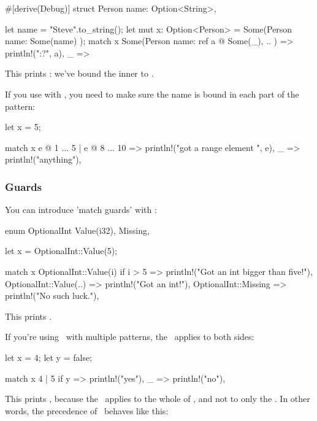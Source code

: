 \begin{rustc}
#[derive(Debug)]
struct Person {
    name: Option<String>,
}

let name = "Steve".to_string();
let mut x: Option<Person> = Some(Person { name: Some(name) });
match x {
    Some(Person { name: ref a @ Some(_), .. }) => println!("{:?}", a),
    _ => {}
}
\end{rustc}

This prints : we've bound the inner  to .

\blank

If you use  with \code{|}, you need to make sure the name is bound in each part of the pattern:

\begin{rustc}
let x = 5;

match x {
    e @ 1 ... 5 | e @ 8 ... 10 => println!("got a range element {}", e),
    _ => println!("anything"),
}
\end{rustc}

\subsubsection*{Guards}

You can introduce 'match guards' with \keyif:

\begin{rustc}
enum OptionalInt {
    Value(i32),
    Missing,
}

let x = OptionalInt::Value(5);

match x {
    OptionalInt::Value(i) if i > 5 => println!("Got an int bigger than five!"),
    OptionalInt::Value(..) => println!("Got an int!"),
    OptionalInt::Missing => println!("No such luck."),
}
\end{rustc}

This prints .

\blank

If you're using \keyif\ with multiple patterns, the \keyif\ applies to both sides:

\begin{rustc}
let x = 4;
let y = false;

match x {
    4 | 5 if y => println!("yes"),
    _ => println!("no"),
}
\end{rustc}

This prints , because the \keyif\ applies to the whole of , and not to only the . In other words, 
the precedence of \keyif\ behaves like this:

